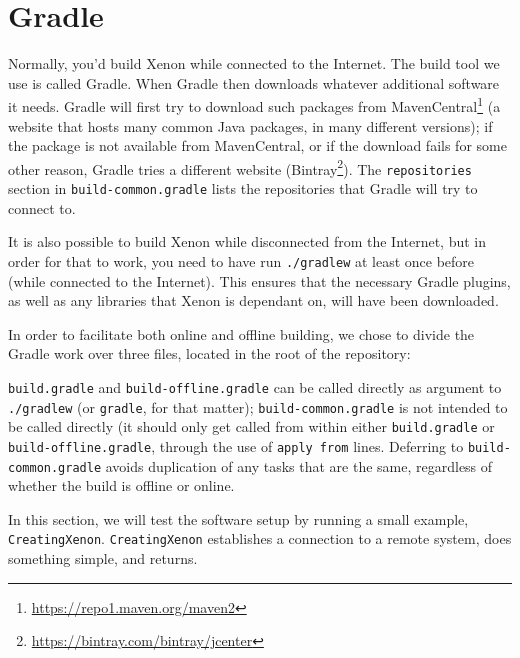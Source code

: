 \section{Gradle}

Normally, you'd build Xenon while connected to the Internet. The build tool we use is called Gradle. When  Gradle then downloads whatever additional software it needs. Gradle will first try to download such packages from MavenCentral\footnote{\url{https://repo1.maven.org/maven2}} (a website that hosts many common Java packages, in many different versions); if the package is not available from MavenCentral, or if the download fails for some other reason, Gradle tries a different website (Bintray\footnote{\url{https://bintray.com/bintray/jcenter}}). The \texttt{repositories} section in \texttt{build-common.gradle} lists the repositories that Gradle will try to connect to.


It is also possible to build Xenon while disconnected from the Internet, but in order for that to work, you need to have run \texttt{./gradlew} at least once before (while connected to the Internet). This ensures that the necessary Gradle plugins, as well as any libraries that Xenon is dependant on, will have been downloaded.

In order to facilitate both online and offline building, we chose to divide the Gradle work over three files, located in the root of the repository:
\begin{enumerate}
\item{\texttt{build.gradle} }
\item{\texttt{build-offline.gradle}} }
\item{\texttt{build-common.gradle}} \index{Xenon!Gradle!build-common.gradle@\texttt{build-common.gradle}}}
\end{enumerate}

\texttt{build.gradle} and \texttt{build-offline.gradle} can be called directly as argument to \texttt{./gradlew} (or \texttt{gradle}, for that matter); \texttt{build-common.gradle} is not intended to be called directly (it should only get called from within either \texttt{build.gradle} or \texttt{build-offline.gradle}, through the use of \texttt{apply from} lines. Deferring to \texttt{build-common.gradle} avoids duplication of any tasks that are the same, regardless of whether the build is offline or online.




In this section, we will test the software setup by running a small example, \texttt{CreatingXenon}. \texttt{CreatingXenon} establishes a connection to a remote system, does something simple, and returns.

